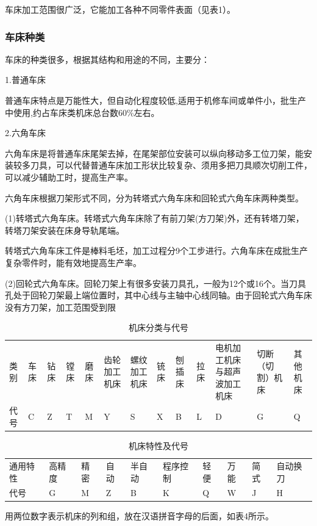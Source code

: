 \documentclass{ctexbook}
\begin{document}
车床加工范围很广泛，它能加工各种不同零件表面（见表1）。

\subsubsection{车床种类}

车床的种类很多，根据其结构和用途的不同，主要分：

1.普通车床

普通车床特点是万能性大，但自动化程度较低,适用于机修车间或单件小，批生产中使用,约占车床类机床总台数60\%左右。

2.六角车床

六角车床是将普通车床尾架去掉，在尾架部位安装可以纵向移动多工位刀架，能安装较多刀具，可以代替普通车床加工形状比较复杂、须用多把刀具顺次切削工件，可以减少辅助工时，提高生产率。

六角车床根据刀架形式不同，分为转塔式六角车床和回轮式六角车床两种类型。

(1)转塔式六角车床。转塔式六角车床除了有前刀架(方刀架)外，还有转塔刀架，转塔刀架安装在床身导轨尾端。

转塔式六角车床工件是棒料毛坯，加工过程分9个工步进行。六角车床在成批生产复杂零件时，能有效地提高生产率。

(2)回轮式六角车床。回轮刀架上有很多安装刀具孔，一般为12个或16个。当刀具孔处于回轮刀架最上端位置时，其中心线与主轴中心线同轴。由于回轮式六角车床没有方刀架，加工范围受到限

\begin{table}[htbp]
	\centering
	\caption{机床分类与代号}
	\begin{tabular}{lllllllllllll}
		类别    & 车床    & 钻床    & 镗床    & 磨床    & 齿轮加工机床 & 螺纹加工机床 & 铳床    & 刨插床   & 拉床    & 电机加工机床与超声波加工机床 & 切断（切割）机床 & 其他机床 \\
		代号    & C     & Z     & T     & M     & Y     & S     & X     & B     & L     & D     & G     & Q \\
	\end{tabular}%
	\label{tab:jichuang}%
\end{table}%


\begin{table}[htbp]
	\centering
	\caption{机床特性及代号}
	\begin{tabular}{llllllllll}
		通用特性  & 高精度   & 精密    & 自动    & 半自动   & 程序控制  & 轻便    & 万能    & 简式    & 自动换刀 \\
		代号    & G     & M     & Z     & B     & K     & Q     & W     & J     & H  \\
	\end{tabular}%
	\label{tab:jichuangtexing}%
\end{table}%
用两位数字表示机床的列和组，放在汉语拼音字母的后面，如表4所示。
\end{document}
